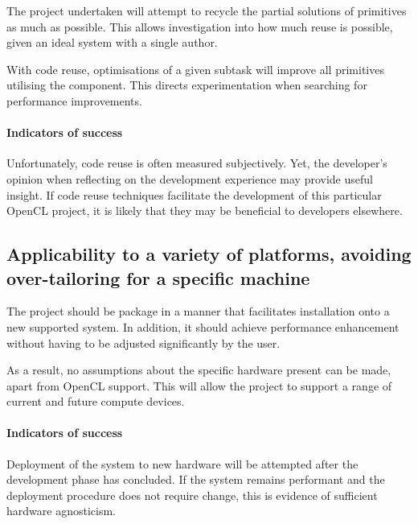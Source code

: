 The project undertaken will attempt to recycle the partial solutions of primitives as much as possible. This allows investigation into how much reuse is possible, given an ideal system with a single author.

With code reuse, optimisations of a given subtask will improve all primitives utilising the component. This directs experimentation when searching for performance improvements.

\paragraph*{Indicators of success}
Unfortunately, code reuse is often measured subjectively. Yet, the developer's opinion when reflecting on the development experience may provide useful insight. If code reuse techniques facilitate the development of this particular \ac{OpenCL} project, it is likely that they may be beneficial to developers elsewhere.

\subsection{Applicability to a variety of platforms, avoiding over-tailoring for a specific machine}
The project should be package in a manner that facilitates installation onto a new supported system. In addition, it should achieve performance enhancement without having to be adjusted significantly by the user.

As a result, no assumptions about the specific hardware present can be made, apart from \ac{OpenCL} support. This will allow the project to support a range of current and future compute devices.

\paragraph*{Indicators of success}
Deployment of the system to new hardware will be attempted after the development phase has concluded. If the system remains performant and the deployment procedure does not require change, this is evidence of sufficient hardware agnosticism.
